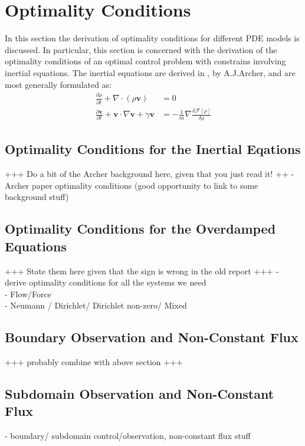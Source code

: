 \documentclass[11pt, a4paper]{article}
\theoremstyle{definition}
\newcommand{\Sta}{\rho}
\newcommand{\Stav}{\mathbf{v}}
\begin{document}
\section{Optimality Conditions}
In this section the derivation of optimality conditions for different PDE models is discussed. In particular, this section is concerned with the derivation of the optimality conditions of an optimal control problem with constrains involving inertial equations. The inertial equations are derived in \cite{Archer1}, by A.J.Archer, and are most generally formulated as:
\begin{align*}
	\frac{\partial \Sta}{\partial t} + \nabla \cdot (\Sta \Stav) &=0\\
	\frac{\partial \Stav}{\partial t} + \Stav \cdot \nabla \Stav + \gamma \Stav &= - \frac{1}{m} \nabla \frac{\delta \mathcal{F}[\Sta]}{\delta \Sta}
\end{align*}

\subsection{Optimality Conditions for the Inertial Eqations}
+++ Do a bit of the Archer background here, given that you just read it! ++
- Archer paper optimality conditions (good opportunity to link to some background stuff)



\subsection{Optimality Conditions for the Overdamped Equations}
+++ State them here given that the sign is wrong in the old report +++
- derive optimality conditions for all the systems we need \\
- Flow/Force\\
- Neumann / Dirichlet/ Dirichlet non-zero/ Mixed\\


\subsection{Boundary Observation and Non-Constant Flux}
+++ probably combine with above section +++

\subsection{Subdomain Observation and Non-Constant Flux}
- boundary/ subdomain control/observation, non-constant flux stuff\\

\end{document}
